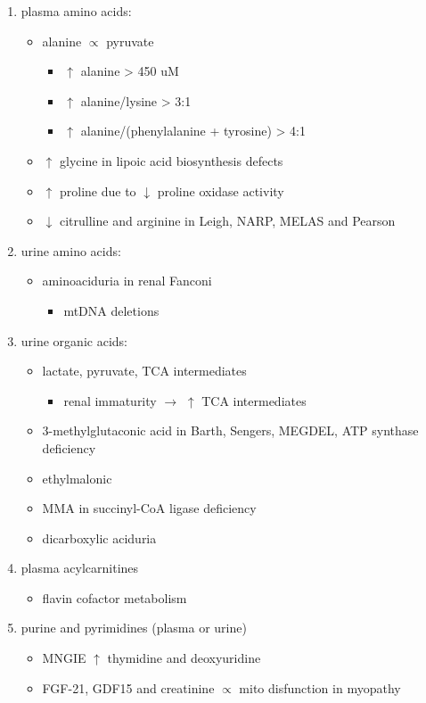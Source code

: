 \documentclass[12pt]{scrartcl}
\begin{document}
\begin{enumerate}
\item plasma amino acids:
\label{sec:org34ac5bf}
\begin{itemize}
\item alanine \(\propto\) pyruvate
\begin{itemize}
\item \(\uparrow\) alanine \textgreater{} 450 uM
\item \(\uparrow\) alanine/lysine \textgreater{} 3:1
\item \(\uparrow\) alanine/(phenylalanine + tyrosine) \textgreater{} 4:1
\end{itemize}
\item \(\uparrow\) glycine in lipoic acid biosynthesis defects
\item \(\uparrow\) proline due to \(\downarrow\) proline oxidase activity
\item \(\downarrow\) citrulline and arginine in Leigh, NARP, MELAS and Pearson
\end{itemize}
\item urine amino acids:
\label{sec:orga8d39cb}
\begin{itemize}
\item aminoaciduria in renal Fanconi
\begin{itemize}
\item mtDNA deletions
\end{itemize}
\end{itemize}
\item urine organic acids:
\label{sec:org1b79bad}
\begin{itemize}
\item lactate, pyruvate, TCA intermediates
\begin{itemize}
\item renal immaturity \(\to\) \(\uparrow\) TCA intermediates
\end{itemize}
\item 3-methylglutaconic acid in Barth, Sengers, MEGDEL, ATP synthase deficiency
\item ethylmalonic
\item MMA in succinyl-CoA ligase deficiency
\item dicarboxylic aciduria
\end{itemize}
\item plasma acylcarnitines
\label{sec:org03d6162}
\begin{itemize}
\item flavin cofactor metabolism
\end{itemize}
\item purine and pyrimidines (plasma or urine)
\label{sec:orge02dc47}
\begin{itemize}
\item MNGIE \(\uparrow\) thymidine and deoxyuridine
\end{itemize}
\begin{itemize}
\item FGF-21, GDF15 and creatinine \(\propto\) mito disfunction in myopathy
\end{itemize}


\end{enumerate}
\end{document}
